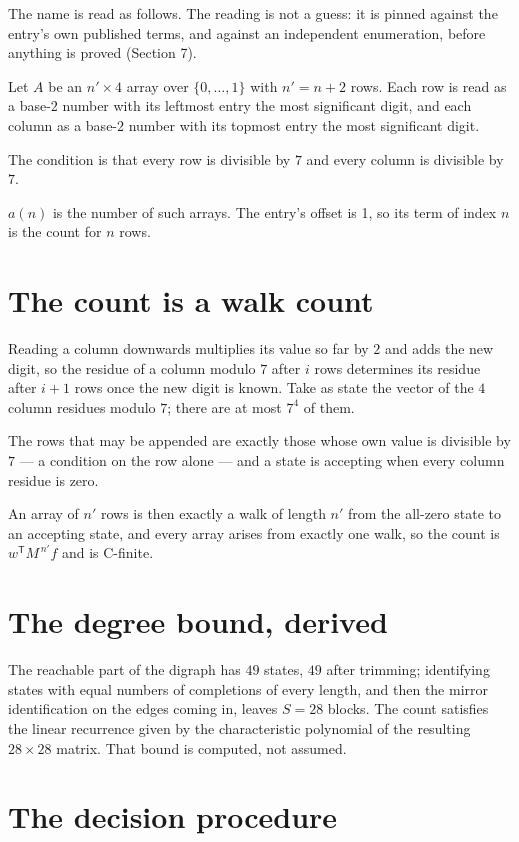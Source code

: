 \documentclass[11pt]{article}
\theoremstyle{definition}
\begin{document}
The name is read as follows. The reading is not a guess: it is pinned against the entry's own published terms, and against an independent enumeration, before anything is proved (Section 7).

Let $A$ be an $n' \times 4$ array over $\{0,\dots,1\}$ with $n' = n + 2$ rows. Each row is read as a base-$2$ number with its leftmost entry the most significant digit, and each column as a base-$2$ number with its topmost entry the most significant digit.

The condition is that every row is divisible by $7$ and every column is divisible by $7$.

$a(n)$ is the number of such arrays. The entry's offset is 1, so its term of index $n$ is the count for $n$ rows.

\section{The count is a walk count}

Reading a column downwards multiplies its value so far by $2$ and adds the new digit, so the residue of a column modulo $7$ after $i$ rows determines its residue after $i+1$ rows once the new digit is known. Take as state the vector of the $4$ column residues modulo $7$; there are at most $7^{4}$ of them.

The rows that may be appended are exactly those whose own value is divisible by $7$ --- a condition on the row alone --- and a state is accepting when every column residue is zero.

An array of $n'$ rows is then exactly a walk of length $n'$ from the all-zero state to an accepting state, and every array arises from exactly one walk, so the count is $w^{\mathsf T}M^{\,n'}f$ and is C-finite.

\section{The degree bound, derived}

The reachable part of the digraph has $49$ states, $49$ after trimming; identifying states with equal numbers of completions of every length, and then the mirror identification on the edges coming in, leaves $S = 28$ blocks. The count satisfies the linear recurrence given by the characteristic polynomial of the resulting $28\times28$ matrix. That bound is computed, not assumed.

\section{The decision procedure}
\end{document}
